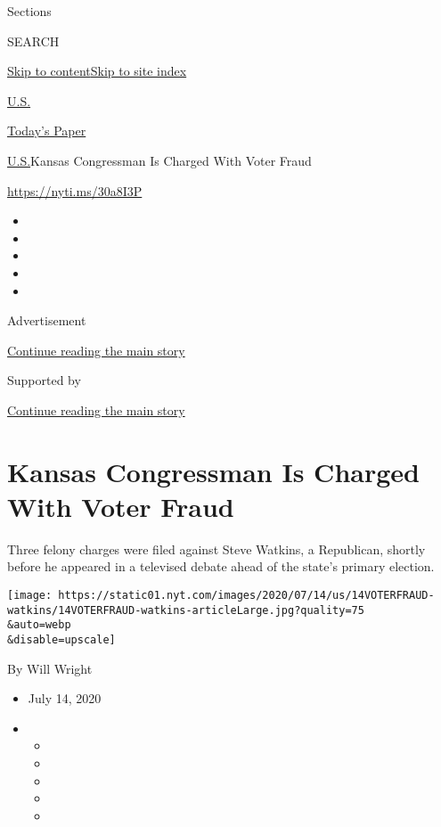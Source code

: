 Sections

SEARCH

\protect\hyperlink{site-content}{Skip to
content}\protect\hyperlink{site-index}{Skip to site index}

\href{https://www.nytimes.com/section/us}{U.S.}

\href{https://myaccount.nytimes.com/auth/login?response_type=cookie\&client_id=vi}{}

\href{https://www.nytimes.com/section/todayspaper}{Today's Paper}

\href{/section/us}{U.S.}\textbar{}Kansas Congressman Is Charged With
Voter Fraud

\url{https://nyti.ms/30a8I3P}

\begin{itemize}
\item
\item
\item
\item
\item
\end{itemize}

Advertisement

\protect\hyperlink{after-top}{Continue reading the main story}

Supported by

\protect\hyperlink{after-sponsor}{Continue reading the main story}

\hypertarget{kansas-congressman-is-charged-with-voter-fraud}{%
\section{Kansas Congressman Is Charged With Voter
Fraud}\label{kansas-congressman-is-charged-with-voter-fraud}}

Three felony charges were filed against Steve Watkins, a Republican,
shortly before he appeared in a televised debate ahead of the state's
primary election.

\texttt{[image: https://static01.nyt.com/images/2020/07/14/us/14VOTERFRAUD-watkins/14VOTERFRAUD-watkins-articleLarge.jpg?quality=75\\\&auto=webp\\\&disable=upscale]}

By Will Wright

\begin{itemize}
\item
  July 14, 2020
\item
  \begin{itemize}
  \item
  \item
  \item
  \item
  \item
  \end{itemize}
\end{itemize}

